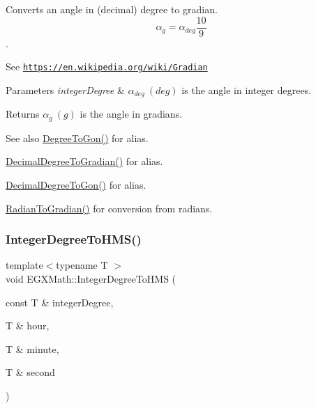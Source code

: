 Converts an angle in (decimal) degree to gradian. \[\alpha_{g}=\alpha_{deg}\frac{10}{9}\]. 

See \href{https://en.wikipedia.org/wiki/Gradian}{\tt https\+://en.\+wikipedia.\+org/wiki/\+Gradian} 
\begin{DoxyParams}{Parameters}
{\em integer\+Degree} & $\alpha_{deg}\ (deg)$ is the angle in integer degrees. \\
\hline
\end{DoxyParams}
\begin{DoxyReturn}{Returns}
$\alpha_{g}\ (g)$ is the angle in gradians. 
\end{DoxyReturn}
\begin{DoxySeeAlso}{See also}
\mbox{\hyperlink{group___e_g_x_math-_angle_conversions-_degree_ga87c3fab0867021e5d2501197b4db6194}{Degree\+To\+Gon()}} for alias. 

\mbox{\hyperlink{group___e_g_x_math-_angle_conversions-_decimal_degree_ga3ac6f1ceb36a4938cdf3b55554734c99}{Decimal\+Degree\+To\+Gradian()}} for alias. 

\mbox{\hyperlink{group___e_g_x_math-_angle_conversions-_decimal_degree_gaeb333a1ad0aeb913c025fbd1be85fcb3}{Decimal\+Degree\+To\+Gon()}} for alias. 

\mbox{\hyperlink{group___e_g_x_math-_angle_conversions-_radian_ga3c1607eae50cbf0186c42485bb3878d5}{Radian\+To\+Gradian()}} for conversion from radians. 
\end{DoxySeeAlso}
\mbox{\label{group___e_g_x_math-_angle_conversions-_integer_degree_gae6b79bd5a92f8c6942b9fc2c50695e6a}} 
\subsubsection{\texorpdfstring{Integer\+Degree\+To\+H\+M\+S()}{IntegerDegreeToHMS()}}
{\footnotesize\ttfamily template$<$typename T $>$ \\
void E\+G\+X\+Math\+::\+Integer\+Degree\+To\+H\+MS (\begin{DoxyParamCaption}\item[{const T \&}]{integer\+Degree,  }\item[{T \&}]{hour,  }\item[{T \&}]{minute,  }\item[{T \&}]{second }\end{DoxyParamCaption})}



